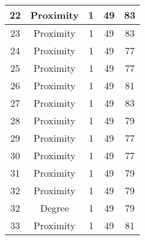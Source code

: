 \documentclass[results.tex]{subfiles}
\begin{document}
\begin{center}
\begin{tabular}{| c || c | c | c | c |}
            \hline
            22                      & Proximity                    & 1                      & 49                      & 83                   \\
            \hline
            23                      & Proximity                    & 1                      & 49                      & 83                   \\
            \hline
            24                      & Proximity                    & 1                      & 49                      & 77                   \\
            \hline
            25                      & Proximity                    & 1                      & 49                      & 77                   \\
            \hline
            26                      & Proximity                    & 1                      & 49                      & 81                   \\
            \hline
            27                      & Proximity                    & 1                      & 49                      & 83                   \\
            \hline
            28                      & Proximity                    & 1                      & 49                      & 79                   \\
            \hline
            29                      & Proximity                    & 1                      & 49                      & 77                   \\
            \hline
            30                      & Proximity                    & 1                      & 49                      & 77                   \\
            \hline
            31                      & Proximity                    & 1                      & 49                      & 79                   \\
            \hline
            32                      & Proximity                    & 1                      & 49                      & 79                   \\
            \hline
            32                      & Degree                       & 1                      & 49                      & 79                   \\
            \hline
            33                      & Proximity                    & 1                      & 49                      & 81                   \\

\end{tabular}
\end{center}
\end{document}
